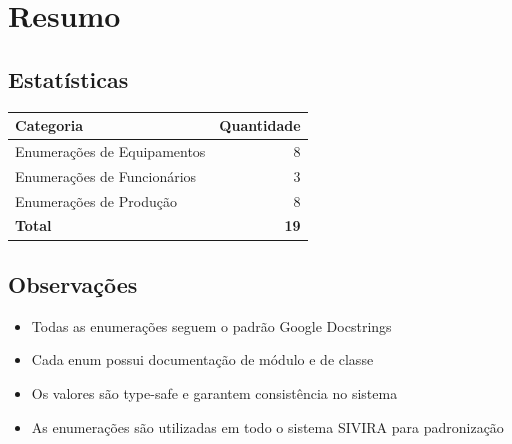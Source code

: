 \documentclass[11pt,a4paper]{article}
\begin{document}
\newpage

\section{Resumo}

\subsection{Estatísticas}

\begin{tabular}{lr}
\textbf{Categoria} & \textbf{Quantidade} \\
\hline
Enumerações de Equipamentos & 8 \\
Enumerações de Funcionários & 3 \\
Enumerações de Produção & 8 \\
\hline
\textbf{Total} & \textbf{19} \\
\end{tabular}

\vspace{1cm}

\subsection{Observações}

\begin{itemize}
    \item Todas as enumerações seguem o padrão Google Docstrings
    \item Cada enum possui documentação de módulo e de classe
    \item Os valores são type-safe e garantem consistência no sistema
    \item As enumerações são utilizadas em todo o sistema SIVIRA para padronização
\end{itemize}
\end{document}
